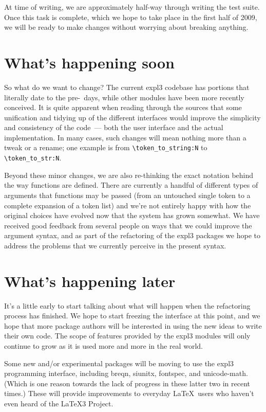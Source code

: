 \documentclass{ltnews}
\begin{document}
At time of writing, we are approximately half-way through writing the test suite. Once this task is complete, which we hope to take place in the first half of 2009, we will be ready to make changes without worrying about breaking anything. 

\section{What's happening soon}

So what do we want to change? The current \textsf{expl3} codebase has portions that literally date to the pre-\LaTeXe\ days, while other modules have been more recently conceived. It is quite apparent when reading through the sources that some unification and tidying up of the different interfaces would improve the simplicity and consistency of the code~--- both the user interface and the actual implementation. In many cases, such changes will mean nothing more than a tweak or a rename; one example is from \verb=\token_to_string:N= to \verb=\token_to_str:N=.

Beyond these minor changes, we are also re-thinking the exact notation behind the way functions are defined. There are currently a handful of different types of arguments that functions may be passed (from an untouched single token to a complete expansion of a token list) and we're not entirely happy with how the original choices have evolved now that the system has grown somewhat. We have received good feedback from several people on ways that we could improve the argument syntax, and as part of the refactoring of the \textsf{expl3} packages we hope to address the problems that we currently perceive in the present syntax.

\section{What's happening later}

It's a little early to start talking about what will happen when the refactoring process has finished. We hope to start freezing the interface at this point, and we hope that more package authors will be interested in using the new ideas to write their own code. The scope of features provided by the \textsf{expl3} modules will only continue to grow as it is used more and more in the real world.

Some new and/or experimental packages will be moving to use the \textsf{expl3} programming interface, including \textsf{breqn}, \textsf{siunitx}, \textsf{fontspec}, and \textsf{unicode-math}. (Which is one reason towards the lack of progress in these latter two in recent times.) These will provide improvements to everyday \LaTeX\ users who haven't even heard of the \LaTeX3 Project.
\end{document}
